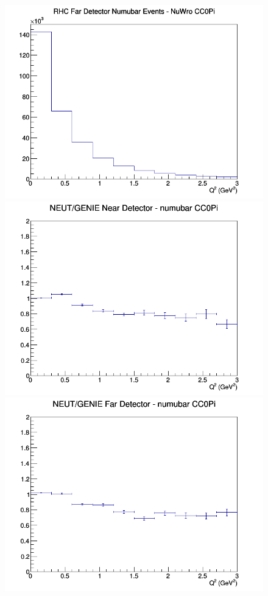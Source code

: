 \documentclass[12pt]{article}
\begin{document}
\begin{figure}[h]
\endminipage
{}
\includegraphics[width=\linewidth]{eff_Q2/FGT/CC0Pi_RHC_FD_numubar_Q2_NuWro.png}
\endminipage
\newline
{}
\includegraphics[width=\linewidth]{eff_Q2/FGT/ratios/CC0Pi_NEUT_GENIE_numubar_near_Q2.png}
\endminipage
{}
\includegraphics[width=\linewidth]{eff_Q2/FGT/ratios/CC0Pi_NEUT_GENIE_numubar_far_Q2.png}

\end{figure}
\end{document}
